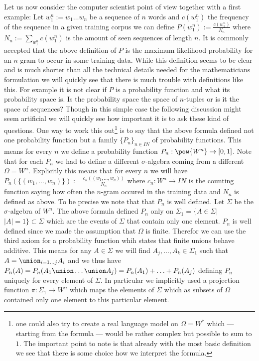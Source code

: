 Let us now consider the computer scientist point of view together with a first example:
Let $w_1^n:=w_1\dots w_n$ be a sequence of $n$ words and $c(w_1^n)$ the frequency of the sequence in a given training corpus we can define $P(w_1^n):=\frac{c(w_1^n)}{N_n}$ where $N_n:=\sum_{w_1^n}c(w_1^n)$ is the amount of seen sequences of length $n$.
It is commonly accepted that the above definition of $P$ is the maximum likelihood probability for an $n$-gram to occur in some training data.
While this definition seems to be clear and is much shorter than all the technical details needed for the mathematicians formulation we will quickly see that there is much trouble with definitions like this.
For example it is not clear if $P$ is a probability function and what its probability space is.
Is the probability space the space of $n$-tuples or is it the space of sequences?
Though in this simple case the following discussion might seem artificial we will quickly see how important it is to ask these kind of questions.
One way to work this out\footnote{one could also try to create a real language model on $\Omega=W^*$ which --- starting from the formula --- would be rather complex but possible to sum to $1$. The important point to note is that already with the most basic definition we see that there is some choice how we interpret the formula.} is to say that the above formula defined not one probability function but a family $\{P_n\}_{n\in IN}$ of probability functions. 
This means for every $n$ we define a probability function $P_n:\pow{W^n}\to[0,1]$.
Note that for each $P_n$ we had to define a different $\sigma$-algebra coming from a different $\Omega=W^n$. 
Explicitly this means that for every $n$ we will have $P_n(\{(w_1,\dots,w_n)\}):=\frac{c_n((w_1,\dots,w_n))}{N_n}$ where $c_n:W^n\to IN$ is the counting function saying how often the $n$-gram occured in the training data and $N_n$ is defined as above.
To be precise we note that that $P_n$ is well defined. Let $\Sigma$ be the $\sigma$-algebra of $W^n$. 
The above formula defined $P_n$ only on $\Sigma_1=\{A\in\Sigma|$ $|A| = 1\}\subset \Sigma$ which are the events of $\Sigma$ that contain only one element.
$P_n$ is well defined since we made the assumption that $\Omega$ is finite. 
Therefor we can use the third axiom for a probability function whih states that finite unions behave additive. 
This means for any $A\in\Sigma$ we will find $A_j,\dots,A_k\in\Sigma_1$ such that $A=\union_{i=1\dots j}A_i$ and we thus have $P_n(A)=P_n(A_1 \union \ldots \union A_j) = P_n(A_1) + \ldots + P_n(A_j)$ defining $P_n$ uniquely for every element of $\Sigma$.
 In particular we implicitly used a projection function $\pi:\Sigma_1\to W^n$  which maps the elements of $\Sigma$ which as subsets of $\Omega$ contained only one element to this particular element.

